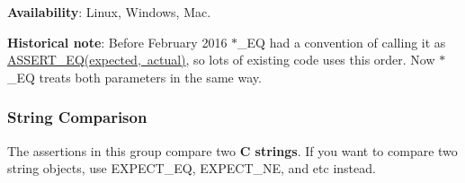 {\bfseries{Availability}}\+: Linux, Windows, Mac.

{\bfseries{Historical note}}\+: Before February 2016 {\ttfamily $\ast$\+\_\+\+EQ} had a convention of calling it as {\ttfamily \mbox{\hyperlink{_obj__test_2lib_2googletest-release-1_88_81_2googletest_2include_2gtest_2gtest_8h_a1a6db8b1338ee7040329322b77779086}{A\+S\+S\+E\+R\+T\+\_\+\+E\+Q(expected, actual)}}}, so lots of existing code uses this order. Now {\ttfamily $\ast$\+\_\+\+EQ} treats both parameters in the same way.

\subsubsection*{String Comparison}

The assertions in this group compare two {\bfseries{C strings}}. If you want to compare two {\ttfamily string} objects, use {\ttfamily E\+X\+P\+E\+C\+T\+\_\+\+EQ}, {\ttfamily E\+X\+P\+E\+C\+T\+\_\+\+NE}, and etc instead.

